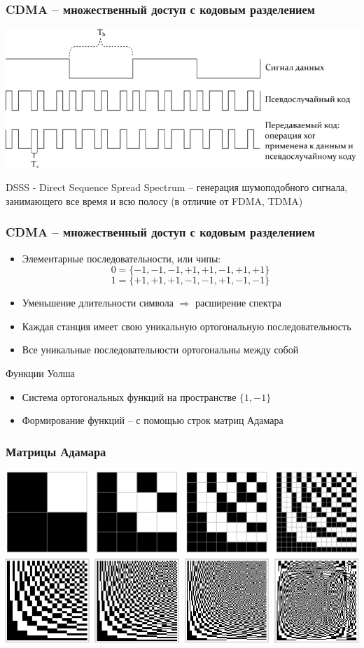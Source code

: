 \documentclass[utf8]{beamer}
\begin{document}
\begin{frame}
\frametitle{CDMA -- множественный доступ с кодовым разделением}
\begin{center}
\includegraphics[width=\textwidth]{pic/cdma.png}
\end{center}
DSSS - Direct Sequence Spread Spectrum -- генерация шумоподобного сигнала, занимающего все время и всю полосу (в отличие от FDMA, TDMA)
\end{frame}
\begin{frame}
\frametitle{CDMA -- множественный доступ с кодовым разделением}
\begin{itemize}
 \item Элементарные последовательности, или чипы:
$$0=\{-1, -1, -1, +1, +1, -1, +1, +1\}$$
$$1=\{+1, +1, +1, -1, -1, +1, -1, -1\}$$
 \item Уменьшение длительности символа $\Rightarrow$ расширение спектра
 \item Каждая станция имеет свою уникальную ортогональную последовательность
 \item Все уникальные последовательности ортогональны между собой
\end{itemize}
\begin{block}{Функции Уолша}
 \begin{itemize}
  \item Система ортогональных функций на пространстве $\{1, -1\}$
  \item Формирование функций -- с помощью строк матриц Адамара
 \end{itemize}

\end{block}

\end{frame}
\begin{frame}
\frametitle{Матрицы Адамара}
\centering
\includegraphics[width=\textwidth]{pic/HadamardMatrices.png}
\end{frame}
\end{document}
